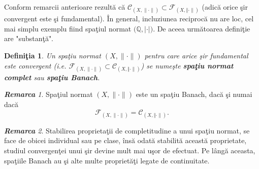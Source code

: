 \documentclass[ a4paper, 12pt]{report}
\newtheorem{definition}{\bf Defini\c tia}[section]
\theoremstyle{remark}
\newtheorem{remarc}{\bf Remarca}[section]
\numberwithin{equation}{section}
\begin{document}
\medskip 

\noindent Conform remarcii anterioare rezult\u a c\u a $\mathcal{C}_{(X, \lVert \cdot \rVert)} \subset \mathcal{F}_{(X, \Vert \cdot \rVert)}$ (adic\u a orice \c sir convergent este \c si fundamental). 
\^In general, incluziunea reciproc\u a nu are loc, cel mai simplu exemplu fiind spa\c tiul normat $\big( \mathbb{Q}, | \cdot |\big)$. De aceea urm\u atoarea defini\c tie are "substan\c t\u a".
\begin{definition}
Un spa\c tiu normat $(X, \lVert \cdot \rVert)$ pentru care arice \c sir fundamental este convergent (i.e.
$ \mathcal{F}_{(X, \lVert \cdot \rVert)} \subset \mathcal{C}_{(X, \Vert \cdot \rVert)}$) se nume\c ste \textbf{spa\c tiu normat complet} sau \textbf{spa\c tiu Banach}.
\end{definition}

\begin{remarc} 
Spa\c tiul normat $(X, \lVert \cdot \rVert)$ este un spa\c tiu Banach, dac\u a \c si numai dac\u a
\[  \mathcal{F}_{(X, \lVert \cdot \rVert)} = \mathcal{C}_{(X, \Vert \cdot \rVert)}.   \]
\end{remarc}

\begin{remarc}
Stabilirea proprieta\c tii de completitudine a unui spa\c tiu normat, se face de obicei individual sau pe clase, \^ins\u a odat\u a stabilit\u a aceast\u a proprietate, studiul convergen\c tei unui \c sir devine mult mai u\c sor de efectuat. Pe l\^ ang\u a aceasta, spa\c tiile Banach au \c si alte multe propriet\u a\c ti legate de continuitate.
\end{remarc}

\bigskip
\end{document}
